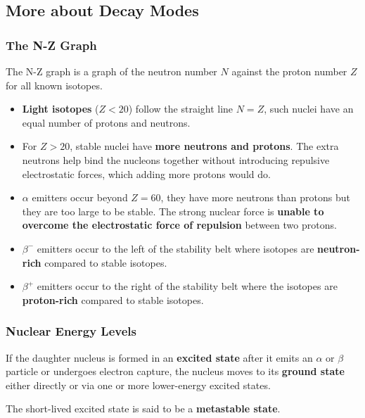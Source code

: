 \subsection{More about Decay Modes}

\subsubsection*{The N-Z Graph}

The N-Z graph is a graph of the neutron number $N$ against the proton number $Z$ for all known isotopes.
\begin{itemize}
    \item \textbf{Light isotopes} ($Z<20$) follow the straight line $N=Z$, such nuclei have an equal number of protons and neutrons.
    \item For $Z>20$, stable nuclei have \textbf{more neutrons and protons}. The extra neutrons help bind the nucleons together without introducing repulsive electrostatic forces, which adding more protons would do.
    \item $\alpha$ emitters occur beyond $Z=60$, they have more neutrons than protons but they are too large to be stable. The strong nuclear force is \textbf{unable to overcome the electrostatic force of repulsion} between two protons.
    \item $\beta^-$ emitters occur to the left of the stability belt where isotopes are \textbf{neutron-rich} compared to stable isotopes.
    \item $\beta^+$ emitters occur to the right of the stability belt where the isotopes are \textbf{proton-rich} compared to stable isotopes.
\end{itemize}

\subsubsection*{Nuclear Energy Levels}

If the daughter nucleus is formed in an \textbf{excited state} after it emits an $\alpha$ or $\beta$ particle or undergoes electron capture, the nucleus moves to its \textbf{ground state} either directly or via one or more lower-energy excited states.

The short-lived excited state is said to be a \textbf{metastable state}.
